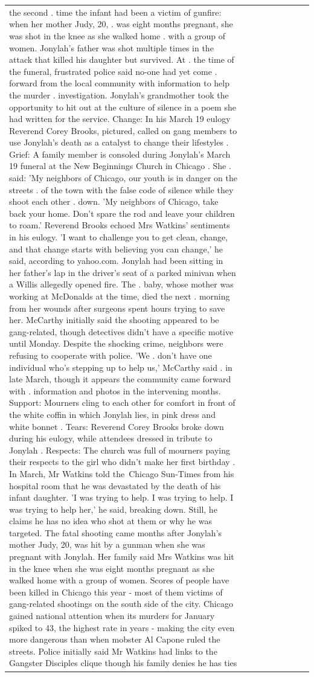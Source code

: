 \begin{table}[H]
\begin{tabular}{lllrlllll}
the second . time the infant had been a victim of gunfire: when her mother Judy, 20, . was eight months pregnant, she was shot in the knee as she walked home . with a group of women. Jonylah's father was shot multiple times in the attack that killed his daughter but survived. At . the time of the funeral, frustrated police said no-one had yet come . forward from the local community with information to help the murder . investigation. Jonylah's grandmother took the opportunity to hit out at the culture of silence in a poem she had written for the service. Change: In his March 19 eulogy Reverend Corey Brooks, pictured, called on gang members to use Jonylah's death as a catalyst to change their lifestyles . Grief: A family member is consoled during Jonylah's March 19 funeral at the New Beginnings Church in Chicago . She . said: 'My neighbors of Chicago, our youth is in danger on the streets . of the town with the false code of silence while they shoot each other . down. 'My neighbors of Chicago, take back your home. Don't spare the rod and leave your children to roam.' Reverend Brooks echoed Mrs Watkins' sentiments in his eulogy. 'I want to challenge you to get clean, change, and that change starts with believing you can change,' he said, according to yahoo.com. Jonylah had been sitting in her father's lap in the driver's seat of a parked minivan when a Willis allegedly opened fire. The . baby, whose mother was working at McDonalds at the time, died the next . morning from her wounds after surgeons spent hours trying to save her. McCarthy initially said the shooting appeared to be gang-related, though detectives didn't have a specific motive until Monday. Despite the shocking crime, neighbors were refusing to cooperate with police. 'We . don't have one individual who's stepping up to help us,' McCarthy said . in late March, though it appears the community came forward with . information and photos in the intervening months. Support: Mourners cling to each other for comfort in front of the white coffin in which Jonylah lies, in pink dress and white bonnet . Tears: Reverend Corey Brooks broke down during his eulogy, while attendees dressed in tribute to Jonylah . Respects: The church was full of mourners paying their respects to the girl who didn't make her first birthday . In March, Mr Watkins told the Chicago Sun-Times from his hospital room that he was devastated by the death of his infant daughter. 'I was trying to help. I was trying to help. I was trying to help her,' he said, breaking down. Still, he claims he has no idea who shot at them or why he was targeted. The fatal shooting came months after Jonylah's mother Judy, 20, was hit by a gunman when she was pregnant with Jonylah. Her family said Mrs Watkins was hit in the knee when she was eight months pregnant as she walked home with a group of women. Scores of people have been killed in Chicago this year - most of them victims of gang-related shootings on the south side of the city. Chicago gained national attention when its murders for January spiked to 43, the highest rate in years - making the city even more dangerous than when mobster Al Capone ruled the streets. Police initially said Mr Watkins had links to the Gangster Disciples clique though his family denies he has ties 
\end{tabular}
\end{table}
